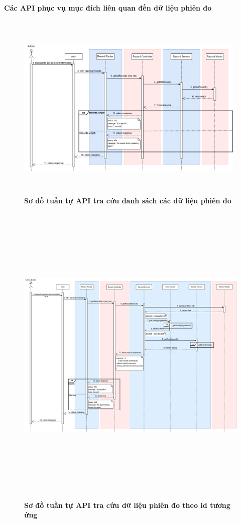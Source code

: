 \paragraph{Các API phục vụ mục đích liên quan đến dữ liệu phiên đo}
\mbox{}
\begin{figure}[H]
	\centering
	\includegraphics[width=11cm,height=9cm]{Images/api_sequence/record/getAllRecord.drawio.png}
	\caption[Sơ đồ tuần tự API tra cứu danh sách các dữ liệu phiên đo]{\bfseries \fontsize{12pt}{0pt}\selectfont Sơ đồ tuần tự API tra cứu danh sách các dữ liệu phiên đo}
	\label{sequence_diagram_get_all_records}
\end{figure}

\begin{figure}[H]
	\centering
	\includegraphics[width=15cm,height=15cm]{Images/api_sequence/record/getRecordById.drawio.png}
	\caption[Sơ đồ tuần tự API tra cứu dữ liệu phiên đo theo id tương ứng]{\bfseries \fontsize{12pt}{0pt}\selectfont Sơ đồ tuần tự API tra cứu dữ liệu phiên đo theo id tương ứng}
	\label{sequence_diagram_get_record_by_id}
\end{figure}

